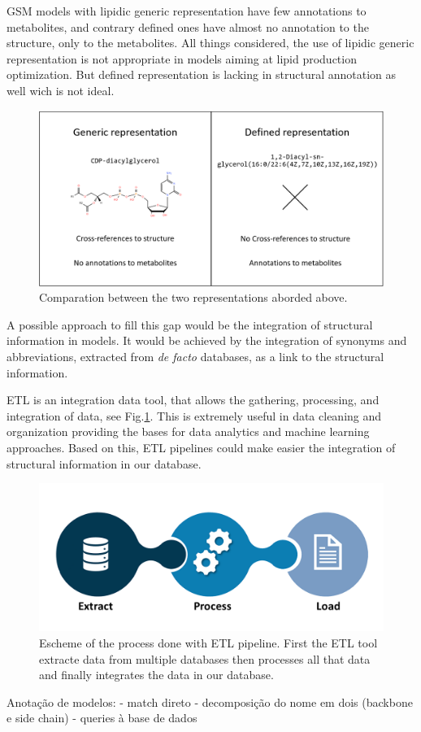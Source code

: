 \documentclass{llncs}
\begin{document}
GSM models with lipidic generic representation have few annotations to metabolites, and contrary defined ones have almost no annotation to the structure, only to the metabolites.
All things considered, the use of lipidic generic representation is not appropriate in models aiming at lipid production optimization. 
But defined representation is lacking in structural annotation as well wich is not ideal.
\begin{figure}
    \includegraphics[width=\textwidth]{imagens/comparação.png}
    \caption{Comparation between the two representations aborded above.}
\end{figure}

A possible approach to fill this gap would be the integration of structural information in models. 
It would be achieved by the integration of synonyms and abbreviations, extracted from \textit{de facto} databases, as a link to the structural information.

ETL is an integration data tool, that allows the gathering, processing, and integration of data, see Fig.\ref{fig4}. 
This is extremely useful in data cleaning and organization providing the bases for data analytics and machine learning approaches. 
Based on this, ETL pipelines could make easier the integration of structural information in our database.

\begin{figure}
    \includegraphics[width=\textwidth]{imagens/ETL.png}
    \caption{Escheme of the process done with ETL pipeline.
    First the ETL tool extracte data from multiple databases
    then processes all that data
    and finally integrates the data in our database.} \label{fig4}    
\end{figure}

Anotação de modelos:
    - match direto
    - decomposição do nome em dois (backbone e side chain) - queries à base de dados





\end{document}
